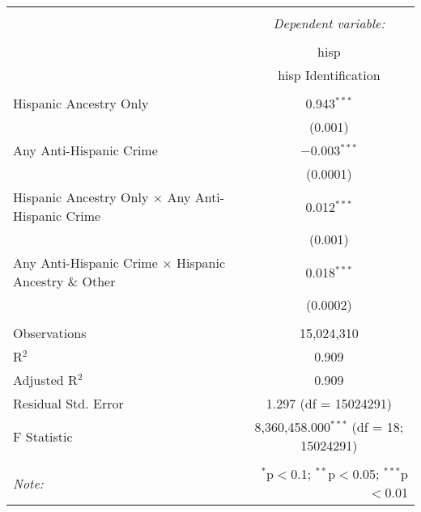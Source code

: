 \documentclass{article}
\begin{document}
    \begin{table}[!htbp] \centering 
      \caption{} 
      \label{} 
    \begin{tabular}{@{\extracolsep{5pt}}lc} 
    \\[-1.8ex]\hline 
    \hline \\[-1.8ex] 
     & \multicolumn{1}{c}{\textit{Dependent variable:}} \\ 
    \cline{2-2} 
    \\[-1.8ex] & hisp \\ 
     & hisp Identification \\ 
    \hline \\[-1.8ex] 
     Hispanic Ancestry Only & 0.943$^{***}$ \\ 
      & (0.001) \\ 
     Any Anti-Hispanic Crime  & $-$0.003$^{***}$ \\ 
      & (0.0001) \\ 
     Hispanic Ancestry Only $\times$ Any Anti-Hispanic Crime  & 0.012$^{***}$ \\ 
      & (0.001) \\ 
     Any Anti-Hispanic Crime $\times$ Hispanic Ancestry \& Other & 0.018$^{***}$ \\ 
      & (0.0002) \\ 
    \hline \\[-1.8ex] 
    Observations & 15,024,310 \\ 
    R$^{2}$ & 0.909 \\ 
    Adjusted R$^{2}$ & 0.909 \\ 
    Residual Std. Error & 1.297 (df = 15024291) \\ 
    F Statistic & 8,360,458.000$^{***}$ (df = 18; 15024291) \\ 
    \hline 
    \hline \\[-1.8ex] 
    \textit{Note:}  & \multicolumn{1}{r}{$^{*}$p$<$0.1; $^{**}$p$<$0.05; $^{***}$p$<$0.01} \\ 
    \end{tabular} 
    \label{tab:hisp_lag}
    \end{table} 

\newpage
\end{document}
